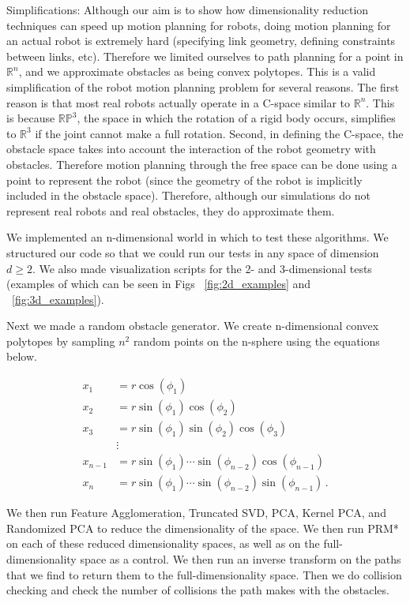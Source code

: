 \documentclass[12pt]{article}
\begin{document}
Simplifications: Although our aim is to show how dimensionality reduction techniques can speed up motion planning for robots, doing motion planning for an actual robot is extremely hard (specifying link geometry, defining constraints between links, etc). Therefore we limited ourselves to path planning for a point in $\mathbb{R}^n$, and we approximate obstacles as being convex polytopes. This is a valid simplification of the robot motion planning problem for several reasons. The first reason is that most real robots actually operate in a C-space similar to $\mathbb{R}^n$. This is because $\mathbb{RP}^3$, the space in which the rotation of a rigid body occurs, simplifies to $\mathbb{R}^3$ if the joint cannot make a full rotation. Second, in defining the C-space, the obstacle space takes into account the interaction of the robot geometry with obstacles. Therefore motion planning through the free space can be done using a point to represent the robot (since the geometry of the robot is implicitly included in the obstacle space). Therefore, although our simulations do not represent real robots and real obstacles, they do approximate them.

We implemented an n-dimensional world in which to test these algorithms. We structured our code so that we could run our tests in any space of dimension $d \geq 2$. We also made visualization scripts for the 2- and 3-dimensional tests (examples of which can be seen in Figs ~\ref{fig:2d_examples} and ~\ref{fig:3d_examples}).

Next we made a random obstacle generator. We create n-dimensional convex polytopes by sampling $n^{2}$ random points on the n-sphere using the equations below. 

\begin{align*}
x_1 &= r \cos(\phi_1) \\
x_2 &= r \sin(\phi_1) \cos(\phi_2) \\
x_3 &= r \sin(\phi_1) \sin(\phi_2) \cos(\phi_3) \\
    &\vdots\\
x_{n-1} &= r \sin(\phi_1) \cdots \sin(\phi_{n-2}) \cos(\phi_{n-1}) \\
x_n &= r \sin(\phi_1) \cdots \sin(\phi_{n-2}) \sin(\phi_{n-1}) \,.
\end{align*}

We then run Feature Agglomeration, Truncated SVD, PCA, Kernel PCA, and Randomized PCA to reduce the dimensionality of the space. We then run PRM* on each of these reduced dimensionality spaces, as well as on the full-dimensionality space as a control. We then run an inverse transform on the paths that we find to return them to the full-dimensionality space. Then we do collision checking and check the number of collisions the path makes with the obstacles.
\end{document}
